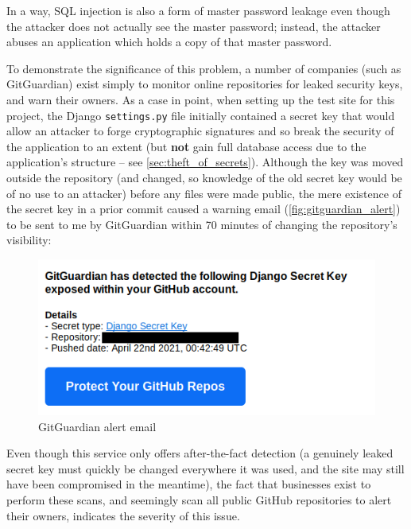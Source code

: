 \documentclass[12pt]{report}
\begin{document}
In a way, SQL injection is also a form of master password leakage even though the attacker does not actually see the master password; instead, the attacker abuses an application which holds a copy of that master password.

To demonstrate the significance of this problem, a number of companies (such as GitGuardian\cite{GitGuardian}) exist simply to monitor online repositories for leaked security keys, and warn their owners. As a case in point, when setting up the test site for this project, the Django \texttt{settings.py} file initially contained a secret key that would allow an attacker to forge cryptographic signatures and so break the security of the application to an extent (but \textbf{not} gain full database access due to the application's structure -- see \autoref{sec:theft_of_secrets}). Although the key was moved outside the repository (and changed, so knowledge of the old secret key would be of no use to an attacker) before any files were made public, the mere existence of the secret key in a prior commit caused a warning email (\autoref{fig:gitguardian_alert}) to be sent to me by GitGuardian within 70 minutes of changing the repository's visibility:

\begin{figure}[ht]
  \begin{center}
    \includegraphics[scale=0.5]{01-gitguardian.png}
  \end{center}
  \caption{GitGuardian alert email}
  \label{fig:gitguardian_alert}
\end{figure}

Even though this service only offers after-the-fact detection (a genuinely leaked secret key must quickly be changed everywhere it was used, and the site may still have been compromised in the meantime), the fact that businesses exist to perform these scans, and seemingly scan all public GitHub repositories to alert their owners, indicates the severity of this issue.
\end{document}
